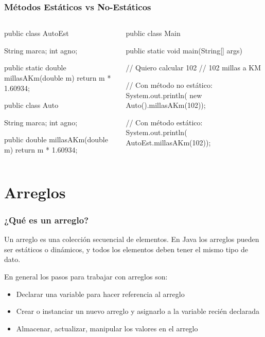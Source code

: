 \documentclass{beamer}
\begin{document}
\begin{frame}[fragile]
  \frametitle{Métodos Estáticos vs No-Estáticos}

  \begin{columns}
    \begin{column}{0.5\textwidth}
      \begin{jsmall}
        public class AutoEst {
          String marca;
          int agno;

          public static double
          millasAKm(double m) {
            return m * 1.60934;
          }          
        }

        public class Auto {
          String marca;
          int agno;

          public double
          millasAKm(double m) {
            return m * 1.60934;
          }          
        }
     \end{jsmall}
    \end{column}
    \begin{column}{0.5\textwidth}
      
      \begin{jsmall}
        public class Main {
          public static void
          main(String[] args) {

            // Quiero calcular 102
            // 102 millas a KM

            // Con método no estático:
            System.out.println(
                new Auto().millasAKm(102));

            // Con método estático:
            System.out.println(
                AutoEst.millasAKm(102));
          }
        }
      \end{jsmall}
      
    \end{column}
  \end{columns}

\end{frame}

\section{Arreglos}

\begin{frame}
  \frametitle{¿Qué es un arreglo?}

  \begin{block}{}
    Un arreglo es una colección secuencial de elementos. En Java los
    arreglos pueden ser estáticos o dinámicos, y todos los elementos
    deben tener el mismo tipo de dato.
  \end{block}

  En general los pasos para trabajar con arreglos son:
  \begin{itemize}
  \item Declarar una variable para hacer referencia al arreglo
  \item Crear o instanciar un nuevo arreglo y asignarlo a la variable
    recién declarada
  \item Almacenar, actualizar, manipular los valores en el arreglo
  \end{itemize}

\end{frame}
\end{document}
